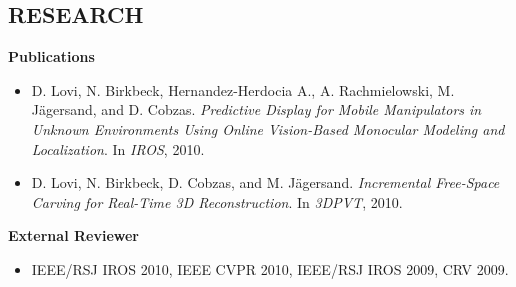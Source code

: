 \documentclass{res}
\begin{document}
\begin{resume}
\section{RESEARCH}
    \vspace*{0.75ex}
    \textbf{Publications}\vspace*{0.666ex}
    \begin{itemize}[label={}, labelsep=*, leftmargin=2.8em]
        \item D. Lovi, N. Birkbeck, Hernandez-Herdocia A., A. Rachmielowski, M. J{\"a}gersand, and D. \hspace*{1.5em}Cobzas.  \textit{Predictive Display for Mobile Manipulators in Unknown Environments Using \hspace*{1.5em}Online Vision-Based Monocular Modeling and Localization}. In \textit{IROS}, 2010.
        \item D. Lovi, N. Birkbeck, D. Cobzas, and M. J{\"a}gersand. \textit{Incremental Free-Space Carving for \hspace*{1.5em}Real-Time 3D Reconstruction}. In \textit{3DPVT}, 2010.
    \end{itemize}
    \textbf{External Reviewer}
    \begin{itemize}[label={}, labelsep=*, leftmargin=2.8em]
    \item IEEE/RSJ IROS 2010, IEEE CVPR 2010, IEEE/RSJ IROS 2009, CRV 2009.
    \end{itemize}


\end{resume}
\end{document}
